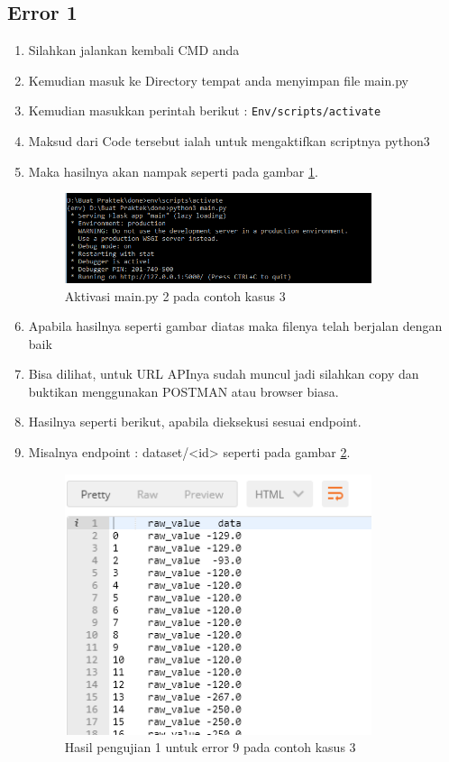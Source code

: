 \subsection{Error 1}
\begin{enumerate}
\item Silahkan jalankan kembali CMD anda
\item Kemudian masuk ke Directory tempat anda menyimpan file main.py
\item Kemudian masukkan perintah berikut :
\verb|Env/scripts/activate|
\item Maksud dari Code tersebut ialah untuk mengaktifkan scriptnya python3
\item Maka hasilnya akan nampak seperti pada gambar \ref{fig:am2}.
\begin{figure}[!htbp]
	\centerline{\includegraphics[width=0.85\textwidth]{figures/10/am2.PNG}}
	\caption{Aktivasi main.py 2 pada contoh kasus 3}
	\label{fig:am2}
\end{figure}

\item Apabila hasilnya seperti gambar diatas maka filenya telah berjalan dengan baik
\item Bisa dilihat, untuk URL APInya sudah muncul jadi silahkan copy dan buktikan menggunakan POSTMAN atau browser biasa.
\item Hasilnya seperti berikut, apabila dieksekusi sesuai endpoint.
\item Misalnya endpoint : dataset/<id>  seperti pada gambar \ref{fig:huji1}.
\begin{figure}[!htbp]
	\centerline{\includegraphics[width=0.85\textwidth]{figures/10/huji1.PNG}}
	\caption{Hasil pengujian 1 untuk error 9 pada contoh kasus 3}
	\label{fig:huji1}
\end{figure}


\end{enumerate}
